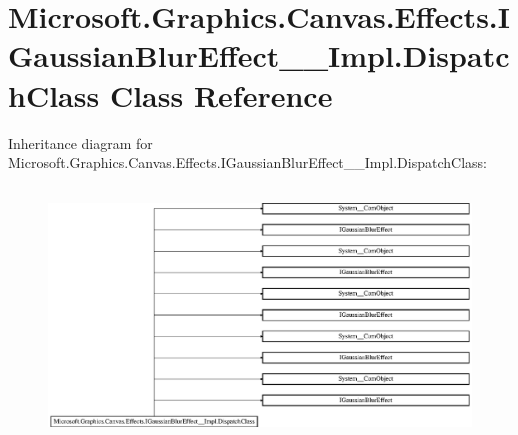 \hypertarget{class_microsoft_1_1_graphics_1_1_canvas_1_1_effects_1_1_i_gaussian_blur_effect_____impl_1_1_dispatch_class}{}\section{Microsoft.\+Graphics.\+Canvas.\+Effects.\+I\+Gaussian\+Blur\+Effect\+\_\+\+\_\+\+Impl.\+Dispatch\+Class Class Reference}
\label{class_microsoft_1_1_graphics_1_1_canvas_1_1_effects_1_1_i_gaussian_blur_effect_____impl_1_1_dispatch_class}
Inheritance diagram for Microsoft.\+Graphics.\+Canvas.\+Effects.\+I\+Gaussian\+Blur\+Effect\+\_\+\+\_\+\+Impl.\+Dispatch\+Class\+:\begin{figure}[H]
\begin{center}
\leavevmode
\includegraphics[height=6.799117cm]{class_microsoft_1_1_graphics_1_1_canvas_1_1_effects_1_1_i_gaussian_blur_effect_____impl_1_1_dispatch_class}
\end{center}
\end{figure}
